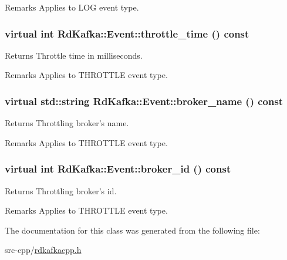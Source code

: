 \begin{DoxyRemark}{Remarks}
Applies to LOG event type. 
\end{DoxyRemark}
\hypertarget{classRdKafka_1_1Event_a21be0397c0bc18657d90341a1eeb1db5}{
\subsubsection[{throttle\_\-time}]{\setlength{\rightskip}{0pt plus 5cm}virtual int RdKafka::Event::throttle\_\-time () const}}
\label{classRdKafka_1_1Event_a21be0397c0bc18657d90341a1eeb1db5}
\begin{DoxyReturn}{Returns}
Throttle time in milliseconds. 
\end{DoxyReturn}
\begin{DoxyRemark}{Remarks}
Applies to THROTTLE event type. 
\end{DoxyRemark}
\hypertarget{classRdKafka_1_1Event_a3295812d6be66d4f601ca7055a26f9ef}{
\subsubsection[{broker\_\-name}]{\setlength{\rightskip}{0pt plus 5cm}virtual std::string RdKafka::Event::broker\_\-name () const}}
\label{classRdKafka_1_1Event_a3295812d6be66d4f601ca7055a26f9ef}
\begin{DoxyReturn}{Returns}
Throttling broker's name. 
\end{DoxyReturn}
\begin{DoxyRemark}{Remarks}
Applies to THROTTLE event type. 
\end{DoxyRemark}
\hypertarget{classRdKafka_1_1Event_ac4355a247e321448d3ae29655da7b724}{
\subsubsection[{broker\_\-id}]{\setlength{\rightskip}{0pt plus 5cm}virtual int RdKafka::Event::broker\_\-id () const}}
\label{classRdKafka_1_1Event_ac4355a247e321448d3ae29655da7b724}
\begin{DoxyReturn}{Returns}
Throttling broker's id. 
\end{DoxyReturn}
\begin{DoxyRemark}{Remarks}
Applies to THROTTLE event type. 
\end{DoxyRemark}


The documentation for this class was generated from the following file:\begin{DoxyCompactItemize}
\item 
src-\/cpp/\hyperlink{rdkafkacpp_8h}{rdkafkacpp.h}\end{DoxyCompactItemize}

